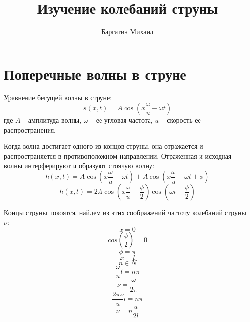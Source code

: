 \documentclass{article}
\title{Изучение колебаний струны}
\date{}
\author{Баргатин Михаил}
\begin{document}
    \maketitle
    \newpage

    \section{Поперечные волны в струне}

    Уравнение бегущей волны в струне:
    \begin{equation}
        s(x, t) = A \cos (x \frac {\omega} {u} - \omega t)
    \end{equation}
    где $A$ -- амплитуда волны, $\omega$ -- ее угловая частота, $u$ -- скорость ее распространения.
    \newline
    
    Когда волна достигает одного из концов струны, она отражается и распространяется в противоположном
    направлении. Отраженная и исходная волны интерферируют и образуют стоячую волну:
    \begin{equation}
        h(x, t) = A \cos (x \frac {\omega} {u} - \omega t) + A \cos (x \frac {\omega} {u} + \omega t + \phi)
    \end{equation}
    \begin{equation}
        h(x, t) = 2A \cos (x \frac {\omega} {u} + \frac {\phi} {2}) \cos (\omega t + \frac {\phi} {2})
    \end{equation}

    Концы струны покоятся, найдем из этих соображений частоту колебаний струны $\nu$:
    \begin{equation*}
        x = 0
    \end{equation*}
    \begin{equation}
        cos(\frac{\phi}{2}) = 0
    \end{equation}
    \begin{equation*}
        \phi = \pi
    \end{equation*}
    \begin{equation*}
        x = l
    \end{equation*}
    \begin{equation*}
        n \in N
    \end{equation*}
    \begin{equation}
        \frac {\omega} {u} l = n \pi
    \end{equation}
    \begin{equation*}
        \nu = \frac {\omega} {2 \pi}
    \end{equation*} 
    \begin{equation}
        \frac {2 \pi \nu}{u} l = n \pi
    \end{equation}
    \begin{equation}
        \nu = n \frac {u} {2 l}
    \end{equation}
\end{document}
